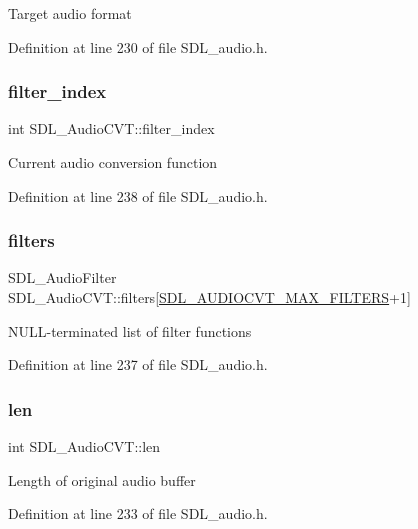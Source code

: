 Target audio format 

Definition at line 230 of file S\+D\+L\+\_\+audio.\+h.

\mbox{\label{struct_s_d_l___audio_c_v_t_a35093b3ad3331c17416c593a76012b63}} 
\subsubsection{\texorpdfstring{filter\_index}{filter\_index}}
{\footnotesize\ttfamily int S\+D\+L\+\_\+\+Audio\+C\+V\+T\+::filter\+\_\+index}

Current audio conversion function 

Definition at line 238 of file S\+D\+L\+\_\+audio.\+h.

\mbox{\label{struct_s_d_l___audio_c_v_t_afeb8dc60716644de3b681653442de1db}} 
\subsubsection{\texorpdfstring{filters}{filters}}
{\footnotesize\ttfamily S\+D\+L\+\_\+\+Audio\+Filter S\+D\+L\+\_\+\+Audio\+C\+V\+T\+::filters\mbox{[}\mbox{\hyperlink{_s_d_l__audio_8h_a3d38380ac4a45a68a0e1c1a7a02bd290}{S\+D\+L\+\_\+\+A\+U\+D\+I\+O\+C\+V\+T\+\_\+\+M\+A\+X\+\_\+\+F\+I\+L\+T\+E\+RS}}+1\mbox{]}}

N\+U\+L\+L-\/terminated list of filter functions 

Definition at line 237 of file S\+D\+L\+\_\+audio.\+h.

\mbox{\label{struct_s_d_l___audio_c_v_t_aeaeb8c5a63c3ab96471fbfdf412c78ff}} 
\subsubsection{\texorpdfstring{len}{len}}
{\footnotesize\ttfamily int S\+D\+L\+\_\+\+Audio\+C\+V\+T\+::len}

Length of original audio buffer 

Definition at line 233 of file S\+D\+L\+\_\+audio.\+h.

